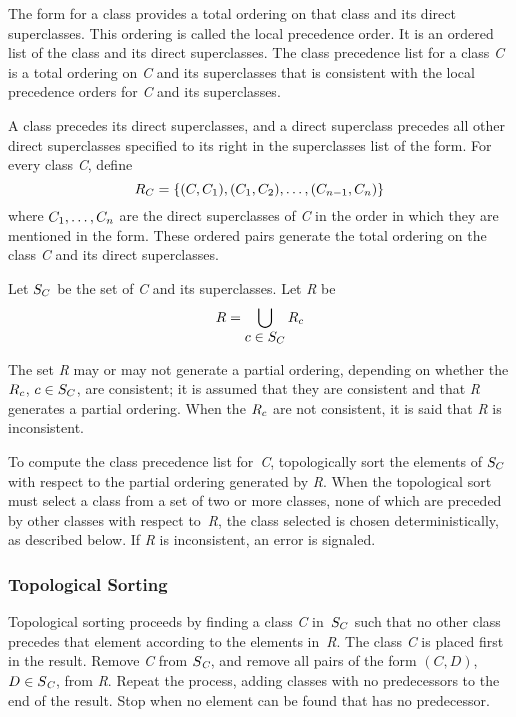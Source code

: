 The  form for a class provides a total ordering on that
class and its direct superclasses.  This ordering is called the {\bit
local precedence order}.  It is an ordered list of the class and its
direct superclasses. The {\bit class precedence list\/} for a
class \emph{C} is a total ordering on \emph{C} and its superclasses that is consistent
with the local precedence orders for \emph{C} and its superclasses.

A class precedes its direct superclasses, and a
direct superclass precedes all other direct superclasses specified to
its right in the superclasses list of the  form.  For
every class \emph{C}, define
$$R_ C=\{(C,C_ 1),(C_ 1,C_ 2),\ldots,(C_ {n-1},C_ {n})\}$$
where $C_ 1,\ldots,C_ {n}$ are
the direct superclasses of \emph{C} in the order in which
they are mentioned in the  form. These ordered pairs
generate the total ordering on the class \emph{C} and its direct
superclasses.

Let $S_ C$ be the set of \emph{C} and its superclasses. Let \emph{R} be
$$R=\bigcup_{\textstyle c\in {S_{C}}} R_ {c}$$

The set \emph{R} may or may not generate a partial ordering, depending on
whether the $R_ {c}$, $c\in S_ {C}$,
are consistent; it is assumed
that they are consistent and that \emph{R} generates a partial ordering.
When the $R_ {c}$ are not consistent, it is said that \emph{R} is inconsistent.


To compute the class precedence list for~\emph{C},
topologically sort the elements of $S_ {C}$ with respect to the
partial ordering generated by \emph{R}.  When the topological
sort must select a class from a set of two or more classes, none of
which are preceded by other classes with respect to~\emph{R},
the class selected is chosen deterministically, as described below.
If \emph{R} is inconsistent, an error is signaled.



\subsubsection{Topological Sorting}

Topological sorting proceeds by finding a class \emph{C} in~$S_ {C}$ such
that no other class precedes that element according to the elements
in~\emph{R}.  The class \emph{C} is placed first in the result.
Remove \emph{C} from $S_ {\hbox{\scriptsize\it C}}$, and remove all pairs of the form
$(C,D)$,
$D\in S_ {\hbox{\scriptsize\it C}}$, from \emph{R}. Repeat the process, adding
classes with no predecessors to the end of the result.  Stop when no
element can be found that has no predecessor.

